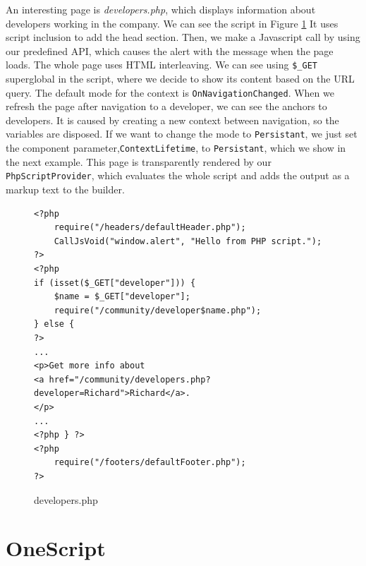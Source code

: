 \par
An interesting page is \textit{developers.php}, which displays information about developers working in the company.
We can see the script in Figure \ref{img25:developer}
It uses script inclusion to add the head section.
Then, we make a Javascript call by using our predefined API, which causes the alert with the message when the page loads.
The whole page uses HTML interleaving.
We can see using \texttt{\$\_GET} superglobal in the script, where we decide to show its content based on the URL query.
The default mode for the context is \texttt{OnNavigationChanged}.
When we refresh the page after navigation to a developer, we can see the anchors to developers.
It is caused by creating a new context between navigation, so the variables are disposed.
If we want to change the mode to \texttt{Persistant}, we just set the component parameter,\texttt{ContextLifetime}, to \texttt{Persistant}, which we show in the next example.
This page is transparently rendered by our \texttt{PhpScriptProvider}, which evaluates the whole script and adds the output as a markup text to the builder.
\par
\begin{figure}
\begin{lstlisting}
<?php
    require("/headers/defaultHeader.php");
    CallJsVoid("window.alert", "Hello from PHP script.");
?>
<?php
if (isset($_GET["developer"])) { 
    $name = $_GET["developer"];
    require("/community/developer$name.php");
} else {
?>
...
<p>Get more info about 
<a href="/community/developers.php?developer=Richard">Richard</a>.
</p>
...
<?php } ?>
<?php
    require("/footers/defaultFooter.php");
?>
\end{lstlisting}
\caption{developers.php}
\label{img25:developer}
\end{figure}

\section{OneScript}

